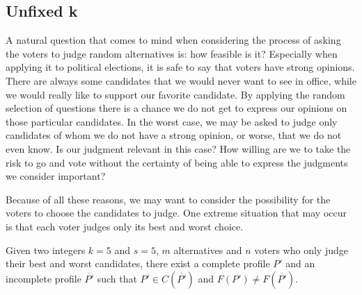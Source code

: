 \documentclass[version=3.21, pagesize, twoside=off, bibliography=totoc, DIV=calc, fontsize=12pt, a4paper]{scrartcl}
\begin{document}
\newpage
{}
\subsection{Unfixed k}
A natural question that comes to mind when considering the process of asking the voters to judge random alternatives is: how feasible is it? Especially when applying it to political elections, it is safe to say that voters have strong opinions. There are always some candidates that we would never want to see in office, while we would really like to support our favorite candidate. By applying the random selection of questions there is a chance we do not get to express our opinions on those particular candidates. In the worst case, we may be asked to judge only candidates of whom we do not have a strong opinion, or worse, that we do not even know. Is our judgment relevant in this case? How willing are we to take the risk to go and vote without the certainty of being able to express the judgments we consider important?

Because of all these reasons, we may want to consider the possibility for the voters to choose the candidates to judge. One extreme situation that may occur is that each voter judges only its best and worst choice. 

\begin{proposition}
	Given two integers $k=5$ and $s=5$, $m$ alternatives and $n$ voters who only judge their best and worst candidates, there exist a complete profile $P'$ and an incomplete profile $\overline{P'}$ such that $P'\in C(\overline{P'})$ and $F(P')\neq F(\overline{P'})$.
\end{proposition}	
\end{document}
